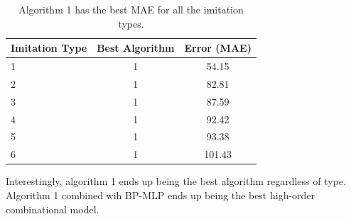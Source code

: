 \begin{table}[center]
	\centering
	\begin{center}
		\begin{tabular}{|l|c|c|} \hline
			\textbf{Imitation Type}	& \textbf{Best Algorithm}	&	\textbf{Error (MAE)}	\\ \hline \hline
			1			& 1				&	54.15			\\ \hline
			2			& 1				&	82.81			\\ \hline
			3			& 1				&	87.59			\\ \hline
			4			& 1				&	92.42			\\ \hline
			5			& 1				&	93.38			\\ \hline
			6			& 1				&	101.43			\\ \hline
		\end{tabular}
	\end{center}
	\caption{Algorithm 1 has the best MAE for all the imitation types.}
	\label{tab:best-for-each}
\end{table}

Interestingly, algorithm 1 ends up being the best algorithm regardless of type. Algorithm 1 combined wih BP-MLP ends up being the best high-order combinational model. 

